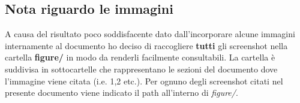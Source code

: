 \subsection{Nota riguardo le immagini}
A causa del risultato poco soddisfacente dato dall'incorporare alcune immagini internamente al documento ho deciso di raccogliere \textbf{tutti} gli screenshot nella cartella \textbf{figure/} in modo da renderli facilmente consultabili. La cartella
è suddivisa in sottocartelle che rappresentano le sezioni del documento dove 
l'immagine viene citata (i.e. 1,2 etc.). 
Per ognuno degli screenshot citati nel presente documento viene indicato il path all'interno di \textit{figure/}.
